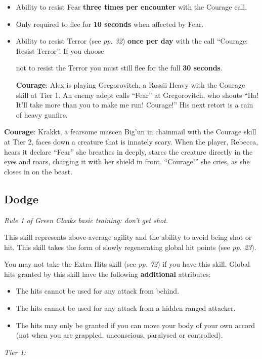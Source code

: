\documentclass{scrbook}
\begin{document}
\begin{itemize}
\item Ability to resist Fear \textbf{three times per encounter} with the Courage call.

\item Only required to flee for \textbf{10 seconds} when affected by Fear.

\item Ability to resist Terror (see \textit{pp. 32}) \textbf{once per day} with the call ``Courage: Resist Terror''. If you choose

not to resist the Terror you must still flee for the full \textbf{30 seconds}.

\textbf{Courage}: Alex is playing Gregorovitch, a Rossii Heavy with the Courage skill at Tier 1. An enemy adept calls ``Fear'' at Gregorovitch, who shouts ``Ha! It'll take more than you to make me run! Courage!'' His next retort is a rain of heavy gunfire.

\end{itemize}

\textbf{Courage}: Krakkt, a fearsome mascen Big'un in chainmail with the Courage skill at Tier 2, faces down a creature that is innately scary. When the player, Rebecca, hears it declare ``Fear'' she breathes in deeply, stares the creature directly in the eyes and roars, charging it with her shield in front. ``Courage!'' she cries, as she closes in on the beast.

\subsection{Dodge}

\textit{Rule 1 of Green Cloaks basic training: don't get shot.}

This skill represents above-average agility and the ability to avoid being shot or hit. This skill takes the form of slowly regenerating global hit points (see \textit{pp. 23}).

You may not take the Extra Hits skill (see \textit{pp. 72}) if you have this skill. Global hits granted by this skill have the following \textbf{additional} attributes:

\begin{itemize}
\item The hits cannot be used for any attack from behind.

\item The hits cannot be used for any attack from a hidden ranged attacker.

\item The hits may only be granted if you can move your body of your own accord (not when you are grappled, unconscious, paralysed or controlled).

\end{itemize}
\textit{Tier 1:}
\end{document}
